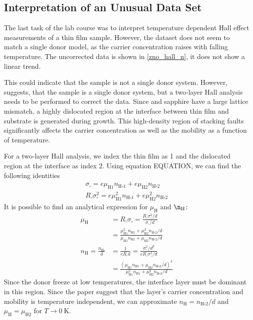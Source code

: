 \subsection{Interpretation of an Unusual Data Set}
The last task of the lab course was to interpret temperature dependent Hall effect
measurements of a  thin film sample.
However, the dataset does not seem to match a single donor model, as the carrier 
concentration raises with falling temperature.
The uncorrected data is shown in \cref{zno_hall_n}, it does not show a linear trend. 

This could indicate that the sample is not a single donor system. 
However,  suggests, that the sample is a single donor system, 
but a two-layer Hall analysis needs to be performed to correct the data. 
Since  and sapphire have a large lattice mismatch, a highly dislocated region 
at the interface between thin film and substrate is generated during growth. 
This high-density region of stacking faults significantly affects the carrier 
concentration as well as the mobility as a function of temperature. 

For a two-layer Hall analysis, we index the  thin film as 1 and the dislocated 
region at the interface as index 2. 
Using equation EQUATION, we can find the following identities
\begin{align}
	\sigma_{\square}=e\mu_{\mathrm{H}1}n_{\mathrm{H} \square 1}
	+e \mu_{\mathrm{H}2} n_{\mathrm{H} \square 2} \\
	R_{\square} \sigma_{\square}^{2}=e \mu_{\mathrm{H} 1}^{2} n_{\mathrm{H} \square 1} 
	+ e\mu_{\mathrm{H} 2}^{2} n_{\mathrm{H} \square 2}
\end{align}
It is possible to find an analytical expression for 
$\mu_\mathrm{H}$ and $\n_\mathrm{H}$:
\begin{align}
	\mu_{\mathrm{H}}&=R_{\square} \sigma_{\square}
	=\frac{R_{\square} \sigma_{\square}^{2} /d}{\sigma_{\square} / d} \\
	&=\frac{\mu_{\mathrm{H}1}^{2}n_{\mathrm{H}1}
	+\mu_\mathrm{H2}^{2} n_{\mathrm{H}\square2} /d}{\mu_{\mathrm{H}1}n_{\mathrm{H}1}
	+\mu_{\mathrm{H}2}n_{\mathrm{H}\square{2}} /d} \\
	n_{\mathrm{H}}=\frac{n_{\mathrm{H} \square}}{d}&=\frac{1}{eR_{\square}d}
	= \frac{\sigma^{2}_{\square}/ d^{2}}{eR_{\square}\sigma_{\square}^{2} / d} \\
	&=\frac{(\mu_{\mathrm{H}1}n_{\mathrm{H}1}
	+\mu_{\mathrm{H}2}n_{\mathrm{H}\square2} /d)^{2}}{\mu_{\mathrm{H}1}^{2}n_{\mathrm{H}1}
	+\mu_{\mathrm{H}2}^{2} n_{\mathrm{H} \square 2} /d}
\end{align}
Since the donor freeze at low temperatures, the interface layer must be dominant in this
region. 
Since the paper suggest that the layer's carrier concentration and mobility is 
temperature independent, we can approximate
$n_{\mathrm{H}}=n_{\mathrm{H} \square 2} / d$ and $\mu_{\mathrm{H}}=\mu_{\mathrm{H 2}}$
for $T \to \qty{0}{\kelvin}$. 

